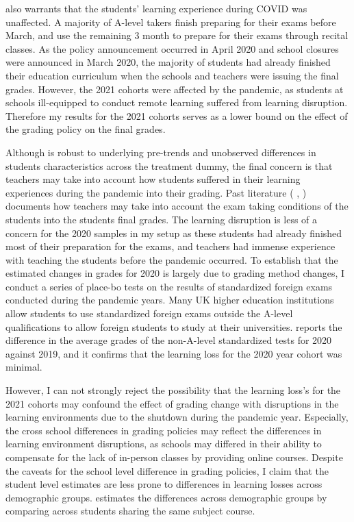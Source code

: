  also warrants that the students' learning experience during COVID was unaffected. A majority of A-level takers finish preparing for their exams before March, and use the remaining 3 month to prepare for their exams through recital classes. As the policy announcement occurred in April 2020 and school closures were announced in March 2020, the majority of students had already finished their education curriculum when the schools and teachers were issuing the final grades. However, the 2021 cohorts were affected by the pandemic, as students at schools ill-equipped to conduct remote learning suffered from learning disruption. Therefore my results for the 2021 cohorts serves as a lower bound on the effect of the grading policy on the final grades. 

Although  is robust to underlying pre-trends and unobserved differences in students characteristics across the treatment dummy, the final concern is that teachers may take into account how students suffered in their learning experiences during the pandemic into their grading. Past literature ( \cite{diamond} , \cite{ferman2022}) documents how teachers may take into account the exam taking conditions of the students into the students final grades.  The learning disruption is less of a concern for the 2020 samples in my setup as these students had already finished most of their preparation for the exams, and teachers had immense experience with teaching the students before the pandemic occurred. To establish that the estimated changes in grades for 2020 is largely due to grading method changes, I conduct a series of place-bo tests on the results of standardized foreign exams conducted during the pandemic years. Many UK higher education institutions allow students to use standardized foreign exams outside the A-level qualifications to allow foreign students to study at their universities.  reports the difference in the average grades of the non-A-level standardized tests for 2020 against 2019, and it confirms that the learning loss for the 2020 year cohort was minimal. 

However, I can not strongly reject the possibility that the learning loss's for the 2021 cohorts may confound the effect of grading change with disruptions in the learning environments due to the shutdown during the pandemic year. Especially, the cross school differences in grading policies may reflect the differences in learning environment disruptions, as schools may differed in their ability to compensate for the lack of in-person classes by providing online courses. Despite the caveats for the school level difference in grading policies, I claim that the student level estimates are less prone to differences in learning losses across demographic groups.   estimates the differences across demographic groups by comparing across students sharing the same subject course. 

